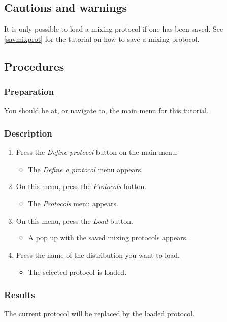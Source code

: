 \subsection{Cautions and warnings}
It is only possible to load a mixing protocol if one has been saved. See \ref{savmixprot} for the tutorial on how to save a mixing protocol.

\subsection{Procedures}
\subsubsection{Preparation}
You should be at, or navigate to, the main menu for this tutorial.

\subsubsection{Description}
\begin{enumerate}
	\item Press the \emph{Define protocol} button on the main menu.
		\begin{itemize}
            \item The \emph{Define a protocol} menu appears.
		\end{itemize}
	\item On this menu, press the \emph{Protocols} button. 
		\begin{itemize}
             \item The \emph{Protocols} menu appears. 
		\end{itemize}
	\item On this menu, press the \emph{Load} button. 
		\begin{itemize}
            \item A pop up with the saved mixing protocols appears. 
		\end{itemize}
    \item Press the name of the distribution you want to load.
   		\begin{itemize}
            \item The selected protocol is loaded.
		\end{itemize}
\end{enumerate}

\subsubsection{Results}
The current protocol will be replaced by the loaded protocol.

